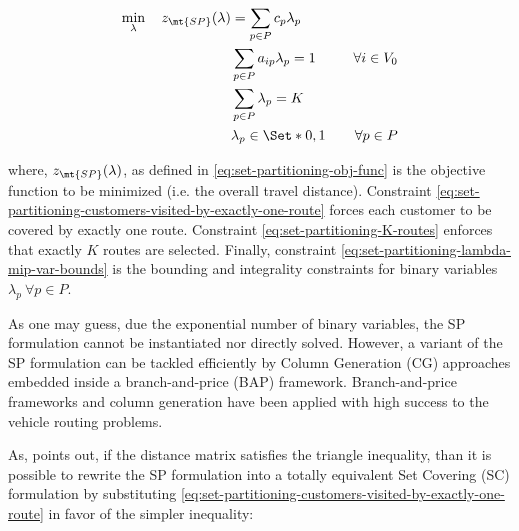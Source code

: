 \begin{align}
	\min_{\lambda} \quad z_\mt{SP}(\lambda) & = \sum_{p \in P}  c_p \lambda_p \label{eq:set-partitioning-obj-func}                                                                                                                                           \\
	                                        & \sum_{p \in P}  a_{ip} \lambda_p = 1                                 & \quad \forall i \in V_0                                              \label{eq:set-partitioning-customers-visited-by-exactly-one-route} \\
	                                        & \sum_{p \in P} \lambda_{p} = K\label{eq:set-partitioning-K-routes}                                                                                                                                             \\
	                                        & \lambda_p                    \in \Set*{0, 1}                         & \quad \forall p \in P \label{eq:set-partitioning-lambda-mip-var-bounds}
\end{align}

where, $z_\mt{SP}(\lambda)$, as defined in \eqref{eq:set-partitioning-obj-func} is the objective function to be minimized (i.e. the overall travel distance).
Constraint \eqref{eq:set-partitioning-customers-visited-by-exactly-one-route} forces each customer to be covered by exactly one route.
Constraint \eqref{eq:set-partitioning-K-routes} enforces that exactly $K$ routes are selected.
Finally, constraint \eqref{eq:set-partitioning-lambda-mip-var-bounds} is the bounding and integrality constraints for binary variables $\lambda_p \ \forall p \in P$.

As one may guess,
due the exponential number of binary variables,
the SP formulation cannot be instantiated nor directly solved.
However,
a variant of the SP formulation can be tackled efficiently by Column Generation (CG) approaches
embedded inside a branch-and-price (BAP) framework.
Branch-and-price frameworks and column generation have been applied
with high success to the vehicle routing problems.


As, \textcite{toth2002} points out, if the distance matrix satisfies the triangle inequality,
than it is possible to rewrite the SP formulation into a totally equivalent Set Covering (SC) formulation
by substituting \cref{eq:set-partitioning-customers-visited-by-exactly-one-route} in favor of the simpler inequality:

